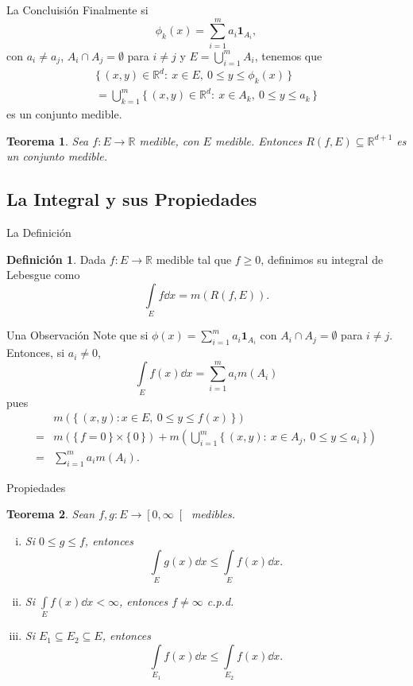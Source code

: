 \documentclass[utf8]{beamer}
\theoremstyle{plain}
\newtheorem{Th}{Teorema}               %
\theoremstyle{definition}
\newtheorem{Def}{Definición}           %
\theoremstyle{remark}
\numberwithin{equation}{section}
\newcommand{\bR}{\mathbb{R}}    %
\newcommand{\lbonj}[1]{\left\lbrack#1\right\lbrack}
\newcommand{\set}[1]{\{\,#1\,\}}    %
\newcommand{\x}{\times}
\renewcommand{\geq}{\geqslant}          %
\renewcommand{\leq}{\leqslant}          %
\newcommand{\ind}{\mathbf{1}}       %
\renewcommand{\.}{\Cdot}                %
\begin{document}
\begin{frame}{La Concluisión}
  Finalmente si 
  $$\phi_k(x)=\sum_{i=1}^ma_i\ind_{A_i},$$
  con $a_i\neq a_j$, $A_i\cap A_j=\emptyset$ para $i\neq j$ y $E=\bigcup_{i=1}^m A_i$, tenemos que 
  \begin{gather*}
    \set{(x,y)\in\bR^d:\ x\in E,\ 0\leq y\leq\phi_k(x)}\\
    =\bigcup_{k=1}^m\set{(x,y)\in\bR^d:\ x\in A_k,\ 0\leq y\leq a_k}
  \end{gather*}
  es un conjunto medible.
\begin{Th}\label{th:AreaBajoCurvaMedible}
Sea $f:E\to\bR$ medible, con $E$ medible. Entonces $R(f,E)\subseteq\bR^{d+1}$ es un conjunto medible.
\end{Th}
\end{frame}

\subsection{La Integral y sus Propiedades}

\begin{frame}{La Definición}
  \begin{Def}\label{def:intLebesgue}
  Dada $f:E\to\bR$ medible tal que $f\geq 0$, definimos su \alert{integral de Lebesgue} como 
  $$\int\limits_E f\dd x=m(R(f,E)).$$
  \end{Def}
  
\end{frame}

\begin{frame}{Una Observación}
  Note que si $\phi(x)=\sum_{i=1}^ma_i\ind_{A_i}$ con $A_i\cap A_j=\emptyset$ para $i\neq j$. Entonces, si $a_i\neq 0$,
  $$\int\limits_E f(x)\dd x=\sum_{i=1}^ma_im(A_i)$$
  pues 
  \begin{align*}
    &m(\set{(x,y):x\in E,\ 0\leq y\leq f(x)})\\
    =&m(\set{f=0}\x\set{0})+m\left(\bigcup_{i=1}^m\set{(x,y):\ x\in A_j,\ 0\leq y\leq a_i}\right)\\
    =&\sum_{i=1}^ma_im(A_i).
  \end{align*}
\end{frame}

\begin{frame}{Propiedades}
  \begin{Th}\label{th:PropsIntLeb}
    Sean $f,g:E\to\lbonj{0,\infty}$ medibles. 
    \begin{enumerate}[(i)]
      \item Si $0\leq g\leq f$, entonces 
      $$\int\limits_E g(x)\dd x\leq\int\limits_E f(x)\dd x.$$
      \item Si $\int\limits_E f(x)\dd x<\infty$, entonces $f\neq\infty$ c.p.d.
      \item Si $E_1\subseteq E_2\subseteq E$, entonces 
      $$\int\limits_{E_1}f(x)\dd x\leq \int\limits_{E_2}f(x)\dd x.$$
    \end{enumerate}
  \end{Th}
\end{frame}
\end{document}
